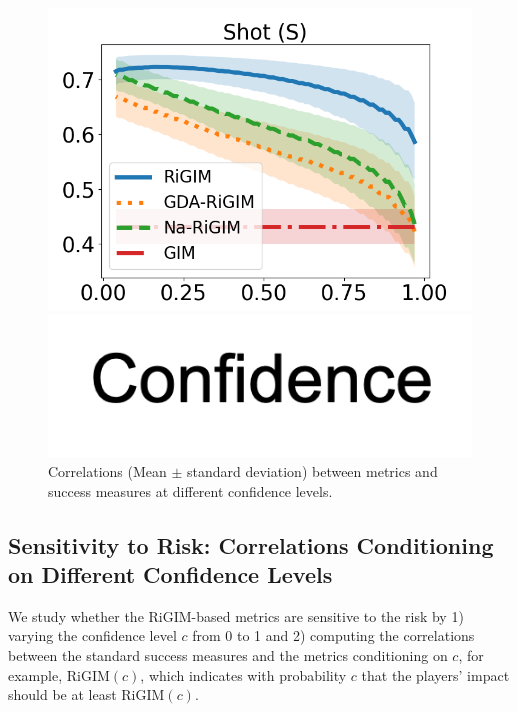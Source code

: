 \documentclass{article}
\newcommand{\confidence}{c}
\newcommand{\sys}{RiGIM}
\begin{document}
\begin{figure}[htbp]
\begin{minipage}{0.16\textwidth}
    \includegraphics[scale=0.17]{figures/risk_curve_S_shadow.png}\par
    \vspace{-0.05in}
    \includegraphics[scale=0.15]{figures/confidence_x_label.png}
    \end{minipage}
    \vspace{-0.15in}
    \caption{Correlations (Mean $\pm$ standard deviation) between metrics and success measures at different confidence levels.}
    \vspace{-0.05in}
    \label{fig:risk-sensitivity}
\end{figure}

\subsection{Sensitivity to Risk: Correlations Conditioning on Different Confidence Levels}
We study whether the \sys-based metrics are sensitive to the risk by 1) varying the confidence level $\confidence$ from 0 to 1 and 2) computing the correlations between the standard success measures and the metrics conditioning on $\confidence$, for example, \sys$(c)$, which indicates with probability $\confidence$ that the players' impact should be at least \sys$(\confidence)$.
\end{document}
